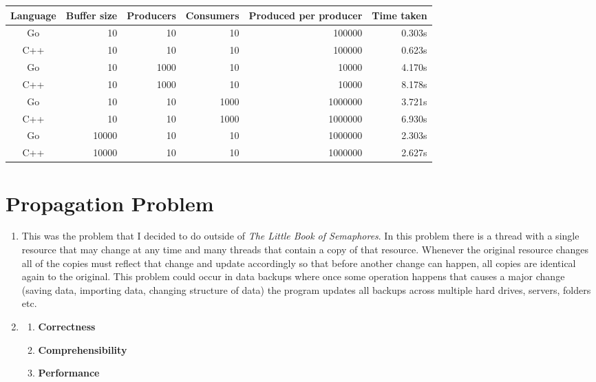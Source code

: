 \documentclass[11pt]{article}
\begin{document}
\begin{tabular}{c r r r r r}
Language    & Buffer size & Producers & Consumers & Produced per producer & Time taken \\
\toprule
Go 			& 10 & 10 & 10 & 100000 & 0.303s \\
C++         & 10 & 10 & 10 & 100000 & 0.623s \\
\cmidrule{1-6}
Go 			& 10 & 1000 & 10 & 10000 & 4.170s \\
C++         & 10 & 1000 & 10 & 10000 & 8.178s \\
\cmidrule{1-6}
Go 			& 10 & 10 & 1000 & 1000000 & 3.721s \\
C++         & 10 & 10 & 1000 & 1000000 & 6.930s \\
\cmidrule{1-6}
Go 			& 10000 & 10 & 10 & 1000000 & 2.303s \\
C++         & 10000 & 10 & 10 & 1000000 & 2.627s \\
\end{tabular}

\pagebreak

\section{Propagation Problem}
\begin{enumerate}
	\item This was the problem that I decided to do outside of \textit{The Little Book of Semaphores}. In this problem there is a thread with a single resource that may change at any time and many threads that contain a copy of that resource. Whenever the original resource changes all of the copies must reflect that change and update accordingly so that before another change can happen, all copies are identical again to the original. This problem could occur in data backups where once some operation happens that causes a major change (saving data, importing data, changing structure of data) the program updates all backups across multiple hard drives, servers, folders etc.

	\item 
	\begin{enumerate}
	\item \textbf{Correctness}\linebreak
	
	\item \textbf{Comprehensibility}\linebreak
	
	\item \textbf{Performance}\linebreak
	
	\end{enumerate}	
\end{enumerate}
\end{document}
